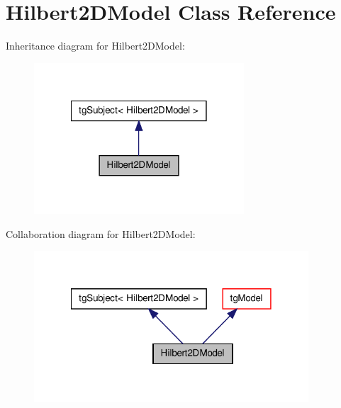 \hypertarget{class_hilbert2_d_model}{\section{Hilbert2\-D\-Model Class Reference}
\label{class_hilbert2_d_model}
}


Inheritance diagram for Hilbert2\-D\-Model\-:\nopagebreak
\begin{figure}[H]
\begin{center}
\leavevmode
\includegraphics[width=222pt]{class_hilbert2_d_model__inherit__graph}
\end{center}
\end{figure}


Collaboration diagram for Hilbert2\-D\-Model\-:\nopagebreak
\begin{figure}[H]
\begin{center}
\leavevmode
\includegraphics[width=290pt]{class_hilbert2_d_model__coll__graph}
\end{center}
\end{figure}
